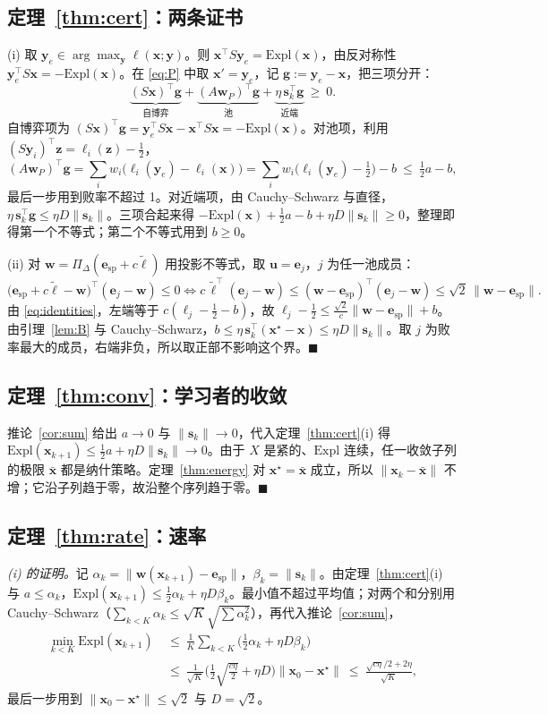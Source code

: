 \documentclass{article}
\theoremstyle{plain}
\theoremstyle{remark}
\newcommand{\Expl}{\mathrm{Expl}}
\newcommand{\Proj}{\Pi}
\newcommand{\simplex}{\Delta}
\newcommand{\bx}{{\bm{x}}}
\newcommand{\by}{{\bm{y}}}
\newcommand{\bw}{{\bm{w}}}
\newcommand{\bz}{{\bm{z}}}
\newcommand{\bu}{{\bm{u}}}
\newcommand{\bg}{{\bm{g}}}
\newcommand{\be}{{\bm{e}}}
\newcommand{\bell}{{\bm{\ell}}}
\newcommand{\aug}{\tilde{\bell}}
\newcommand{\xs}{\bx^{\star}}
\newcommand{\dx}{{\bm{s}}}
\newcommand{\esp}{\be_{\mathrm{sp}}}
\begin{document}
\subsection{定理~\ref{thm:cert}：两条证书}
\label{app:cert}

(i) 取 $\by_e\in\arg\max_\by\ell(\bx;\by)$。则 $\bx^\top S\by_e=\Expl(\bx)$，由反对称性 $\by_e^\top S\bx=-\Expl(\bx)$。在 \eqref{eq:P} 中取 $\bx'=\by_e$，记 $\bg:=\by_e-\bx$，把三项分开：
\[
\underbrace{(S\bx)^\top \bg}_{\text{自博弈}}+\underbrace{(A\bw_P)^\top \bg}_{\text{池}}+\underbrace{\eta\,\dx_k^\top \bg}_{\text{近端}}\ \ge\ 0 .
\]
自博弈项为 $(S\bx)^\top \bg=\by_e^\top S\bx-\bx^\top S\bx=-\Expl(\bx)$。对池项，利用 $(S\by_i)^\top \bz=\ell_i(\bz)-\tfrac12$，
\[
(A\bw_P)^\top \bg=\sum_iw_i\big(\ell_i(\by_e)-\ell_i(\bx)\big)=\sum_iw_i\big(\ell_i(\by_e)-\tfrac12\big)-b\ \le\ \tfrac12a-b ,
\]
最后一步用到败率不超过 1。对近端项，由 Cauchy--Schwarz 与直径，$\eta\,\dx_k^\top \bg\le\eta D\|\dx_k\|$。三项合起来得 $-\Expl(\bx)+\tfrac12a-b+\eta D\|\dx_k\|\ge0$，整理即得第一个不等式；第二个不等式用到 $b\ge0$。

(ii) 对 $\bw=\Proj_\simplex(\esp+c\aug)$ 用投影不等式，取 $\bu=\be_j$，$j$ 为任一池成员：
\[
\big(\esp+c\aug-\bw\big)^\top(\be_j-\bw)\le0\iff c\,\aug^\top(\be_j-\bw)\le(\bw-\esp)^\top(\be_j-\bw)\le\sqrt2\,\|\bw-\esp\| .
\]
由 \eqref{eq:identities}，左端等于 $c(\ell_j-\tfrac12-b)$，故 $\ell_j-\tfrac12\le\frac{\sqrt2}c\|\bw-\esp\|+b$。由引理~\ref{lem:B} 与 Cauchy--Schwarz，$b\le\eta\,\dx_k^\top(\xs-\bx)\le\eta D\|\dx_k\|$。取 $j$ 为败率最大的成员，右端非负，所以取正部不影响这个界。\hfill$\blacksquare$

\subsection{定理~\ref{thm:conv}：学习者的收敛}
\label{app:conv}

推论~\ref{cor:sum} 给出 $a\to0$ 与 $\|\dx_k\|\to0$，代入定理~\ref{thm:cert}(i) 得 $\Expl(\bx_{k+1})\le\tfrac12a+\eta D\|\dx_k\|\to0$。由于 $X$ 是紧的、$\Expl$ 连续，任一收敛子列的极限 $\bar \bx$ 都是纳什策略。定理~\ref{thm:energy} 对 $\xs=\bar \bx$ 成立，所以 $\|\bx_k-\bar \bx\|$ 不增；它沿子列趋于零，故沿整个序列趋于零。\hfill$\blacksquare$

\subsection{定理~\ref{thm:rate}：速率}
\label{app:rate}

\textit{(i) 的证明。}记 $\alpha_k=\|\bw(\bx_{k+1})-\esp\|$，$\beta_k=\|\dx_k\|$。由定理~\ref{thm:cert}(i) 与 $a\le\alpha_k$，$\Expl(\bx_{k+1})\le\tfrac12\alpha_k+\eta D\beta_k$。最小值不超过平均值；对两个和分别用 Cauchy--Schwarz（$\sum_{k<K}\alpha_k\le\sqrt K\sqrt{\sum\alpha_k^2}$），再代入推论~\ref{cor:sum}，
\begin{align*}
\min_{k<K}\Expl(\bx_{k+1})\ &\le\ \frac1K\sum_{k<K}\Big(\tfrac12\alpha_k+\eta D\beta_k\Big)\\
&\le\ \frac{1}{\sqrt K}\Big(\tfrac12\sqrt{\tfrac{c\eta}{2}}+\eta D\Big)\|\bx_0-\xs\|\ \le\ \frac{\sqrt{c\eta}/2+2\eta}{\sqrt K},
\end{align*}
最后一步用到 $\|\bx_0-\xs\|\le\sqrt2$ 与 $D=\sqrt2$。
\end{document}
